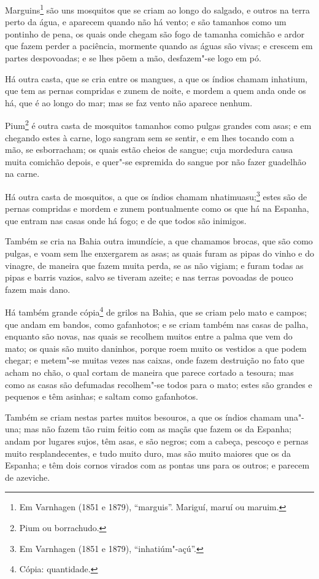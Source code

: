 Marguins\footnote{ Em Varnhagen (1851 e 1879), ``marguis''. Mariguí, maruí ou maruim.} são
uns mosquitos que se criam ao longo do salgado, e outros na terra perto da água, e
aparecem quando não há vento; e são tamanhos como um pontinho de pena, os quais onde
chegam são fogo de tamanha comichão e ardor que fazem perder a paciência, mormente quando
as águas são vivas; e crescem em partes despovoadas; e se lhes põem a mão, desfazem"-se
logo em pó.

Há outra casta, que se cria entre os mangues, a que os índios chamam inhatium, que tem as
pernas compridas e zunem de noite, e mordem a quem anda onde os há, que é ao longo do mar;
mas se faz vento não aparece nenhum.

Pium\footnote{ Pium ou borrachudo.} é outra casta de mosquitos tamanhos como pulgas
grandes com asas; e em chegando estes à carne, logo sangram sem se sentir, e em lhes
tocando com a mão, se esborracham; os quais estão cheios de sangue; cuja mordedura causa
muita comichão depois, e quer"-se espremida do sangue por não fazer guadelhão na carne.


Há outra casta de mosquitos, a que os índios chamam nhatimuasu;\footnote{ Em Varnhagen
(1851 e 1879), ``inhatiúm"-açú''.} estes são de pernas compridas e mordem e zunem
pontualmente como os que há na Espanha, que entram nas casas onde há fogo; e de que todos
são inimigos.

Também se cria na Bahia outra imundície, a que chamamos brocas, que são como pulgas, e
voam sem lhe enxergarem as asas; as quais furam as pipas do vinho e do vinagre, de maneira
que fazem muita perda, se as não vigiam; e furam todas as pipas e barris vazios, salvo se
tiveram azeite; e nas terras povoadas de pouco fazem mais dano.

Há também grande cópia\footnote{ Cópia: quantidade.} de grilos na Bahia, que se criam pelo
mato e campos; que andam em bandos, como gafanhotos; e se criam também nas
casas de palha, enquanto são novas, nas quais se recolhem muitos entre a palma que vem do
mato; os quais são muito daninhos, porque roem muito os vestidos a que podem chegar; e
metem"-se muitas vezes nas caixas, onde fazem destruição no fato que acham no chão, o qual
cortam de maneira que parece cortado a tesoura; mas como as casas são defumadas
recolhem"-se todos para o mato; estes são grandes e pequenos e têm asinhas; e saltam como
gafanhotos.

Também se criam nestas partes muitos besouros, a que os índios chamam una"-una; mas não
fazem tão ruim feitio com as maçãs que fazem os da Espanha; andam por lugares sujos, têm
asas, e são negros; com a cabeça, pescoço e pernas muito resplandecentes, e tudo muito
duro, mas são muito maiores que os da Espanha; e têm dois cornos virados com as pontas uns
para os outros; e parecem de azeviche.

